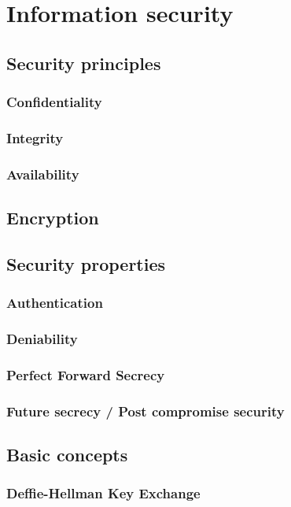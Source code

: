 
\section{Information security }

\subsection{Security principles}
\subsubsection{Confidentiality}
\subsubsection{Integrity}
\subsubsection{Availability}

\subsection{Encryption}

\subsection{Security properties}
\subsubsection{Authentication}
\subsubsection{Deniability}
\subsubsection{Perfect Forward Secrecy}
\subsubsection{Future secrecy / Post compromise security}

\subsection{Basic concepts}
\subsubsection{Deffie-Hellman Key Exchange}
